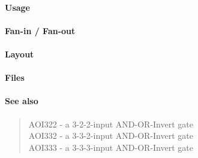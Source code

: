 \paragraph{Usage}

\paragraph{Fan-in / Fan-out}

\paragraph{Layout}

\paragraph{Files}

\paragraph{See also}
\begin{quote}
    AOI322 - a 3-2-2-input AND-OR-Invert gate \\
    AOI332 - a 3-3-2-input AND-OR-Invert gate \\
    AOI333 - a 3-3-3-input AND-OR-Invert gate
\end{quote}
